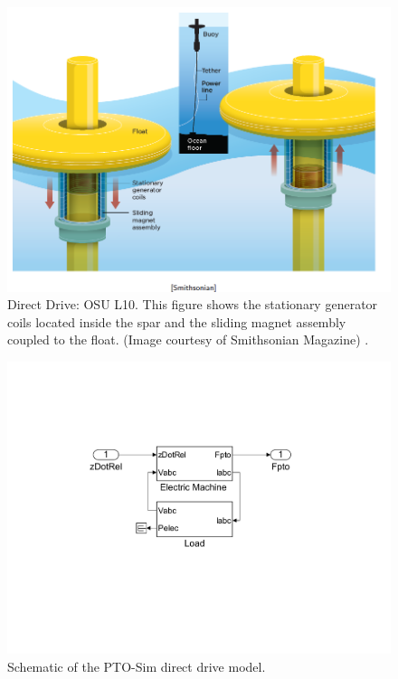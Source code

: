 \documentclass[twocolumn,10pt]{asme2e}
\begin{document}
\begin{figure}[t]
    \centering
    \includegraphics[width=1\columnwidth]{Images/PAWECSmithsonian}
    \caption{Direct Drive: OSU L10. This figure shows the stationary generator coils located inside the spar and the sliding magnet assembly coupled to the float.  (Image courtesy of Smithsonian Magazine) \cite{Rusch:2009aa}.} 
    \label{L10}
    \end{figure}


\begin{figure}[t]
    \centering
    \includegraphics[width=1\columnwidth]{Images/DirectDriveSimulink}
    \caption{Schematic of the PTO-Sim direct drive model.}
    \label{DD}
    \end{figure}
\end{document}
